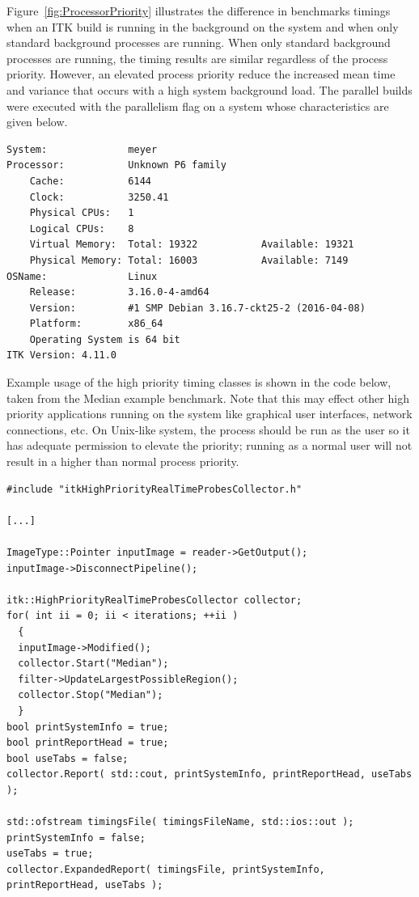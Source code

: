 \documentclass{InsightArticle}
\begin{document}
Figure~\ref{fig:ProcessorPriority} illustrates the difference in benchmarks
timings when an ITK build is running in the background on the system and when
only standard background processes are running. When only standard background
processes are running, the timing results are similar regardless of the
process priority. However, an elevated process priority reduce the increased
mean time and variance that occurs with a high system background load.  The
parallel builds were executed with the  parallelism flag on a
system whose characteristics are given below.

\begin{verbatim}
System:              meyer
Processor:           Unknown P6 family
    Cache:           6144
    Clock:           3250.41
    Physical CPUs:   1
    Logical CPUs:    8
    Virtual Memory:  Total: 19322           Available: 19321
    Physical Memory: Total: 16003           Available: 7149
OSName:              Linux
    Release:         3.16.0-4-amd64
    Version:         #1 SMP Debian 3.16.7-ckt25-2 (2016-04-08)
    Platform:        x86_64
    Operating System is 64 bit
ITK Version: 4.11.0
\end{verbatim}

Example usage of the high priority timing classes is shown in the code below,
taken from the Median example benchmark. Note that this may effect other high
priority applications running on the system like graphical user interfaces,
network connections, etc. On Unix-like system, the process should be run as the
 user so it has adequate permission to elevate the priority; running
as a normal user will not result in a higher than normal process priority.

\begin{verbatim}
#include "itkHighPriorityRealTimeProbesCollector.h"

[...]

ImageType::Pointer inputImage = reader->GetOutput();
inputImage->DisconnectPipeline();

itk::HighPriorityRealTimeProbesCollector collector;
for( int ii = 0; ii < iterations; ++ii )
  {
  inputImage->Modified();
  collector.Start("Median");
  filter->UpdateLargestPossibleRegion();
  collector.Stop("Median");
  }
bool printSystemInfo = true;
bool printReportHead = true;
bool useTabs = false;
collector.Report( std::cout, printSystemInfo, printReportHead, useTabs );

std::ofstream timingsFile( timingsFileName, std::ios::out );
printSystemInfo = false;
useTabs = true;
collector.ExpandedReport( timingsFile, printSystemInfo, printReportHead, useTabs );
\end{verbatim}
\end{document}
